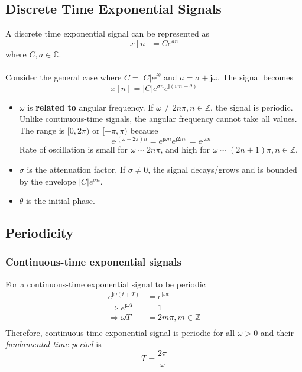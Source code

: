 \documentclass[oneside]{book}
\begin{document}
\subsection{Discrete Time Exponential Signals}
A discrete time exponential signal can be represented as
\begin{equation}
  x[n] = Ce^{an}
\end{equation}
where \(C, a \in \mathbb{C}\).
\\\\
\noindent Consider the general case where \(C = |C|e^{j\theta}\) and \(a = \sigma + \mathsf{j}\omega\). The signal becomes
\[
  x[n] = |C|e^{\sigma n}e^{\mathsf{j}(wn + \theta)}
\]
\begin{itemize}
  \item $\omega$ is \textbf{related to} angular frequency. If \(\omega \neq 2n\pi, n\in\mathbb{Z}\), the signal is periodic.\\
        Unlike continuous-time signals, the angular frequency cannot take all values. The range is \([0, 2\pi)\) or \([-\pi, \pi)\) because
        \[
          e^{\mathsf{j}(\omega + 2\pi)n} = e^{\mathsf{j}\omega n}e^{\mathsf{j}2n\pi} = e^{\mathsf{j}\omega n}
        \]
        Rate of oscillation is small for $\omega\sim 2n\pi$, and high for $\omega\sim (2n + 1)\pi, n\in\mathbb{Z}$.
  \item $\sigma$ is the attenuation factor. If \(\sigma \neq 0\), the signal decays/grows and is bounded by the envelope \(|C|e^{\sigma n}\).
  \item $\theta$ is the initial phase.
\end{itemize}

\subsection{Periodicity}
\subsubsection{Continuous-time exponential signals}
For a continuous-time exponential signal to be periodic
\begin{align*}
  e^{\mathsf{j}\omega(t + T)}        & = e^{\mathsf{j}\omega t} \\
  \Rightarrow e^{\mathsf{j}\omega T} & = 1                      \\
  \Rightarrow \omega T               & = 2m\pi, m\in\mathbb{Z}  \\
\end{align*}
Therefore, continuous-time exponential signal is periodic for all $\omega>0$ and their \textit{fundamental time period} is
\[
  T = \frac{2\pi}{\omega}
\]
\end{document}
